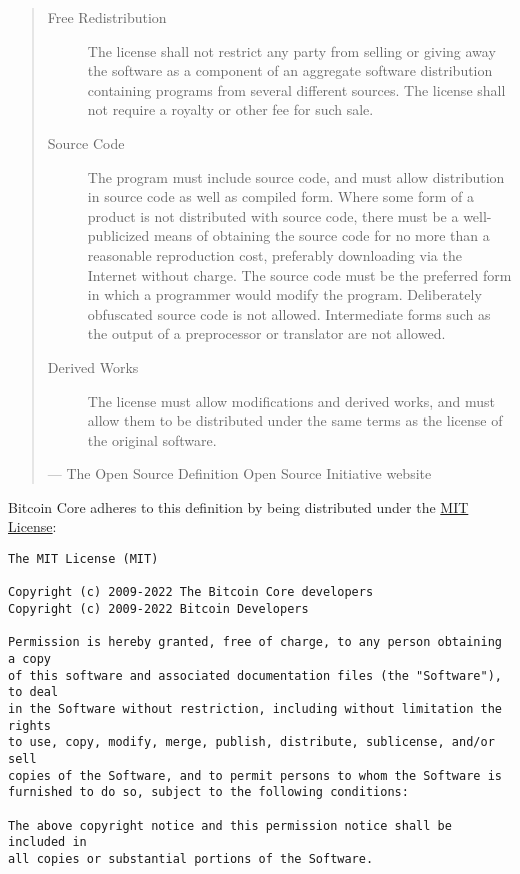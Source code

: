 \begin{quote}
\begin{description}
\item[Free Redistribution]
The license shall not restrict any party from selling or giving away the
software as a component of an aggregate software distribution containing
programs from several different sources. The license shall not require a
royalty or other fee for such sale.
\item[Source Code]
The program must include source code, and must allow distribution in
source code as well as compiled form. Where some form of a product is
not distributed with source code, there must be a well-publicized means
of obtaining the source code for no more than a reasonable reproduction
cost, preferably downloading via the Internet without charge. The source
code must be the preferred form in which a programmer would modify the
program. Deliberately obfuscated source code is not allowed.
Intermediate forms such as the output of a preprocessor or translator
are not allowed.
\item[Derived Works]
The license must allow modifications and derived works, and must allow
them to be distributed under the same terms as the license of the
original software.
\end{description}

---  The Open Source Definition Open Source Initiative website
\end{quote}

Bitcoin Core adheres to this definition by being distributed under the
\href{https://github.com/bitcoin/bitcoin/blob/master/COPYING}{MIT
License}:

\begin{verbatim}
The MIT License (MIT)

Copyright (c) 2009-2022 The Bitcoin Core developers
Copyright (c) 2009-2022 Bitcoin Developers

Permission is hereby granted, free of charge, to any person obtaining a copy
of this software and associated documentation files (the "Software"), to deal
in the Software without restriction, including without limitation the rights
to use, copy, modify, merge, publish, distribute, sublicense, and/or sell
copies of the Software, and to permit persons to whom the Software is
furnished to do so, subject to the following conditions:

The above copyright notice and this permission notice shall be included in
all copies or substantial portions of the Software.
\end{verbatim}

